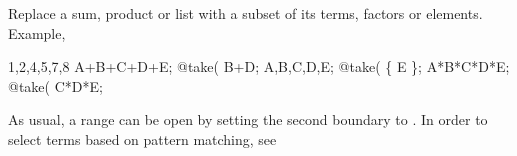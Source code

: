 
Replace a sum, product or list with a subset of its terms, factors or
 elements. Example,
\begin{screen}{1,2,4,5,7,8}
A+B+C+D+E;
@take(%
B+D;
{A,B,C,D,E};
@take(%
\{ E \};
A*B*C*D*E;
@take(%
C*D*E;
\end{screen}
As usual, a range can be open by setting the second boundary
to .  In order to select terms based on pattern
matching, see 

